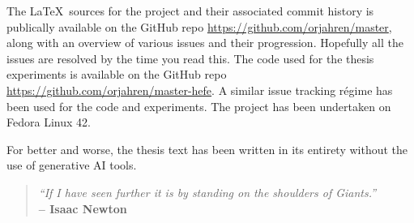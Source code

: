 The \LaTeX~sources for the project and their associated commit history is publically available on
the GitHub repo \url{https://github.com/orjahren/master}, along with an overview of various issues
and their progression. Hopefully all the issues are resolved by the time you read this. The code
used for the thesis experiments is available on the GitHub repo
\url{https://github.com/orjahren/master-hefe}. A similar issue tracking régime has been used for the
code and experiments. The project has been undertaken on Fedora Linux 42.

For better and worse, the thesis text has been written in its entirety without the use of generative
AI tools.

\begin{center}
    \vspace{2em}
    \begin{quote}
        \emph{``If I have seen further it is by standing on the shoulders of Giants.''}\\
        \vspace{1em}
        \textbf{-- Isaac Newton}
    \end{quote}
    \vspace{2em}
\end{center}
